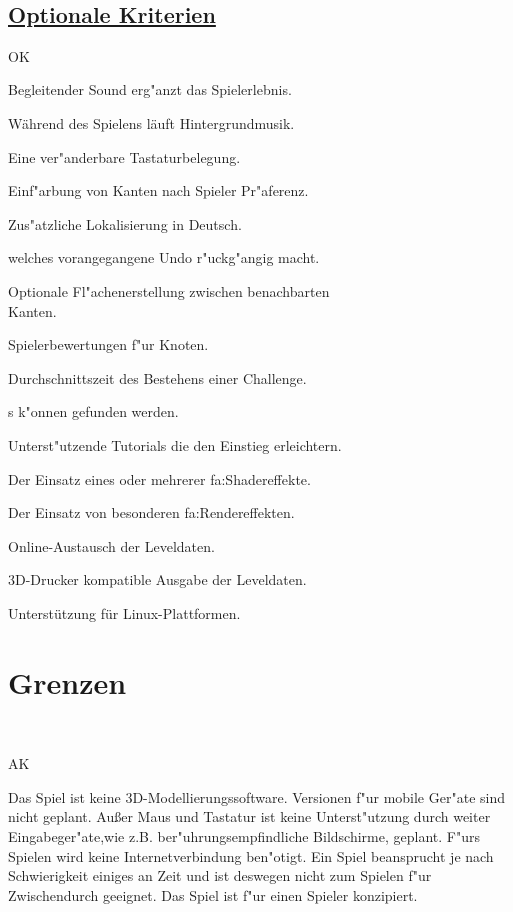 ~\\


\subsection*{\underline{Optionale Kriterien}}

\begin{ids}{\gls{OK}}


\id[10] Begleitender Sound erg{"a}nzt das Spielerlebnis.

\id[20] Während des Spielens läuft Hintergrundmusik.

\id[30] Eine ver{"a}nderbare Tastaturbelegung.

\id[40] Einf{"a}rbung von Kanten nach Spieler Pr{"a}ferenz.

\id[50] Zus{"a}tzliche Lokalisierung in Deutsch.

 welches vorangegangene Undo r{"u}ckg{"a}ngig macht.

\id[70] Optionale Fl{"a}chenerstellung zwischen benachbarten \\Kanten.

\id[90] Spielerbewertungen f{"u}r Knoten.

\id[100] Durchschnittszeit des Bestehens einer Challenge.

s k{"o}nnen gefunden werden.

\id[120] Unterst{"u}tzende Tutorials die den Einstieg erleichtern.
	
\id[130] Der Einsatz eines oder mehrerer \gls{fa:Shadereffekte}.

\id[140] Der Einsatz von besonderen \gls{fa:Rendereffekte}n.

\id[150] Online-Austausch der Leveldaten.

\id[160] 3D-Drucker kompatible Ausgabe der Leveldaten.

\id[170] Unterstützung für Linux-Plattformen.

\end{ids}


%
%
\clearpage


\section{Grenzen}
\label{UF:Grenzen}

~\\

\begin{ids}{\gls{AK}}

	
	\id[10] Das Spiel ist keine 3D-Modellierungssoftware.
	\id[20] Versionen f{"u}r mobile Ger{"a}te sind nicht geplant.
	\id[20] Außer Maus und Tastatur ist keine Unterst{"u}tzung durch weiter Eingabeger{"a}te,wie z.B.  ber{"u}hrungsempfindliche Bildschirme, geplant.
	\id[40]F{"u}rs Spielen wird keine Internetverbindung ben{"o}tigt. 
	\id[50] Ein Spiel beansprucht je nach Schwierigkeit einiges an Zeit und ist deswegen nicht zum Spielen f{"u}r Zwischendurch geeignet.
	\id[60] Das Spiel ist f{"u}r einen Spieler konzipiert.
	
\end{ids}


